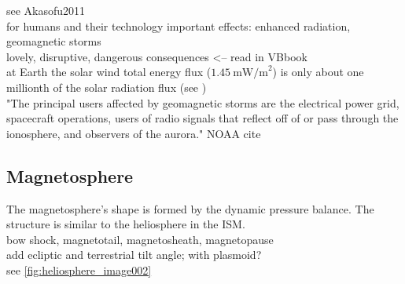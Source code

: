 see Akasofu2011\\

for humans and their technology important effects: enhanced radiation, geomagnetic storms\\
lovely, disruptive, dangerous consequences <-- read in VBbook\\

at Earth the solar wind total energy flux ($1.45~\text{mW/m}^2$) is only about one millionth of the solar radiation flux (see \citet[p.~153]{Schwenn1990})\\

"The principal users affected by geomagnetic storms are the electrical power grid, spacecraft operations, users of radio signals that reflect off of or pass through the ionosphere, and observers of the aurora." NOAA cite\\


\subsection{Magnetosphere}
\label{sec:magnetosphere}

The magnetosphere's shape is formed by the dynamic pressure balance. The structure is similar to the heliosphere in the ISM.\\

bow shock, magnetotail, magnetosheath, magnetopause\\
add ecliptic and terrestrial tilt angle; with plasmoid?\\
see \autoref{fig:heliosphere_image002}\\
\begin{figure}[htb]
\end{figure}

